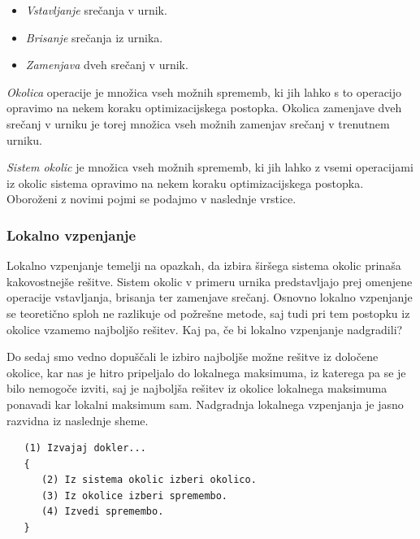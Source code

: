 \documentclass[a4paper,10pt]{article}
\begin{document}
\begin{itemize}
   \item \emph{Vstavljanje} srečanja v urnik.
   \item \emph{Brisanje} srečanja iz urnika.
   \item \emph{Zamenjava} dveh srečanj v urnik.
\end{itemize}

\noindent
\emph{Okolica} operacije je množica vseh možnih sprememb, ki jih lahko s to operacijo
opravimo na nekem koraku optimizacijskega postopka. Okolica zamenjave dveh srečanj v urniku
je torej množica vseh možnih zamenjav srečanj v trenutnem urniku.

\emph{Sistem okolic} je množica vseh možnih sprememb, ki jih lahko z vsemi operacijami iz
okolic sistema opravimo na nekem koraku optimizacijskega postopka. Oboroženi z novimi pojmi
se podajmo v naslednje vrstice.

\subsubsection{Lokalno vzpenjanje}

Lokalno vzpenjanje temelji na opazkah, da izbira širšega sistema okolic prinaša kakovostnejše
rešitve. Sistem okolic v primeru urnika predstavljajo prej omenjene operacije vstavljanja,
brisanja ter zamenjave srečanj. Osnovno lokalno vzpenjanje se teoretično sploh ne razlikuje
od požrešne metode, saj tudi pri tem postopku iz okolice vzamemo najboljšo rešitev. Kaj pa,
če bi lokalno vzpenjanje nadgradili?

Do sedaj smo vedno dopuščali le izbiro najboljše možne rešitve iz določene okolice, kar nas
je hitro pripeljalo do lokalnega maksimuma, iz katerega pa se je bilo nemogoče izviti, saj
je najboljša rešitev iz okolice lokalnega maksimuma ponavadi kar lokalni maksimum sam.
Nadgradnja lokalnega vzpenjanja je jasno razvidna iz naslednje sheme.


\begin{verbatim}
   (1) Izvajaj dokler...
   {
      (2) Iz sistema okolic izberi okolico.
      (3) Iz okolice izberi spremembo.
      (4) Izvedi spremembo.
   }
\end{verbatim}
\end{document}
